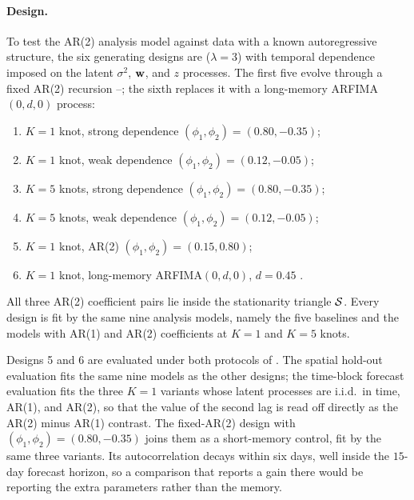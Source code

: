 \documentclass[12pt]{article}
\begin{document}
\paragraph{Design.}
To test the AR(2) analysis model against data with a known autoregressive structure, the six generating designs are \skewt ($\lambda = 3$) with temporal dependence imposed on the latent $\sigma^2$, $\mbox{\bf w}$, and $z$ processes.  The first five evolve through a fixed AR(2) recursion --; the sixth replaces it with a long-memory ARFIMA$(0, d, 0)$ process:
\begin{enumerate}[leftmargin=3em]
  \item $K = 1$ knot, strong dependence $(\phi_1, \phi_2) = (0.80, -0.35)$;
  \item $K = 1$ knot, weak dependence $(\phi_1, \phi_2) = (0.12, -0.05)$;
  \item $K = 5$ knots, strong dependence $(\phi_1, \phi_2) = (0.80, -0.35)$;
  \item $K = 5$ knots, weak dependence $(\phi_1, \phi_2) = (0.12, -0.05)$;
  \item $K = 1$ knot, AR(2) $(\phi_1, \phi_2) = (0.15, 0.80)$;
  \item $K = 1$ knot, long-memory ARFIMA$(0, d, 0)$, $d = 0.45$ \parencite{davies_tests_1987}.
\end{enumerate}
All three AR(2) coefficient pairs lie inside the stationarity triangle ${\cal S}$.  Every design is fit by the same nine analysis models, namely the five baselines and the \skewt models with AR(1) and AR(2) coefficients at $K = 1$ and $K = 5$ knots.

Designs 5 and 6 are evaluated under both protocols of .  The spatial hold-out evaluation fits the same nine models as the other designs; the time-block forecast evaluation fits the three $K = 1$ \skewt variants whose latent processes are i.i.d.\ in time, AR(1), and AR(2), so that the value of the second lag is read off directly as the AR(2) minus AR(1) contrast.  The fixed-AR(2) design with $(\phi_1, \phi_2) = (0.80, -0.35)$ joins them as a short-memory control, fit by the same three variants.  Its autocorrelation decays within six days, well inside the $15$-day forecast horizon, so a comparison that reports a gain there would be reporting the extra parameters rather than the memory.
\end{document}
